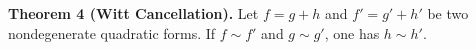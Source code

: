 \textbf{Theorem 4 (Witt Cancellation).} Let $f = g + h$ and $f' = g' + h'$ be two nondegenerate quadratic forms. If $f \sim f'$ and $g \sim g'$, one has $h \sim h'$.
